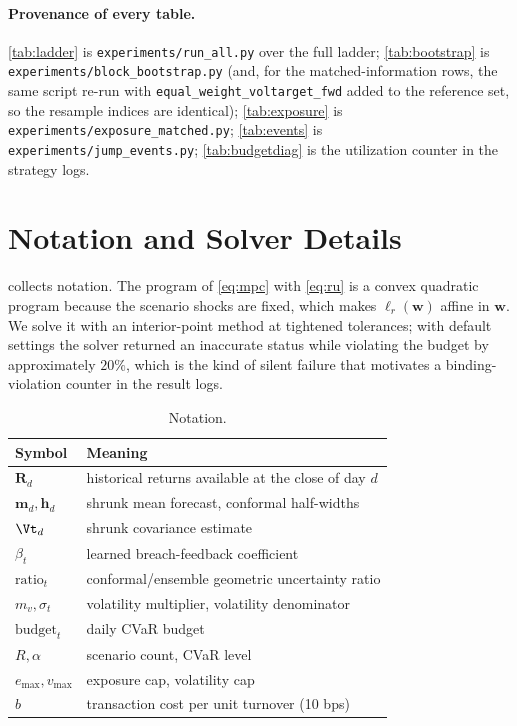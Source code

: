 \documentclass[journal]{IEEEtran}
\newcommand{\Rt}{\mathbf{R}}
\newcommand{\w}{\mathbf{w}}
\begin{document}
\paragraph{Provenance of every table.} \cref{tab:ladder} is
\texttt{experiments/run\_all.py} over the full ladder; \cref{tab:bootstrap} is
\texttt{experiments/block\_bootstrap.py} (and, for the matched-information rows,
the same script re-run with \texttt{equal\_weight\_voltarget\_fwd} added to the
reference set, so the resample indices are identical);
\cref{tab:exposure} is \texttt{experiments/exposure\_matched.py};
\cref{tab:events} is \texttt{experiments/jump\_events.py};
\cref{tab:budgetdiag} is the utilization counter in the strategy logs.

\appendices

\section{Notation and Solver Details}
\label{app:notation}

 collects notation. The program of \cref{eq:mpc} with
\cref{eq:ru} is a convex quadratic program because the scenario shocks are fixed,
which makes $\ell_r(\w)$ affine in $\w$. We solve it with an interior-point method
at tightened tolerances; with default settings the solver returned an inaccurate
status while violating the budget by approximately $20\%$, which is the kind of
silent failure that motivates a binding-violation counter in the result logs.

\begin{table}[!t]
  \centering
  \caption{Notation.}
  \label{tab:notation}
  \begin{tabular}{ll}
    \toprule
    Symbol & Meaning \\
    \midrule
    $\Rt_d$ & historical returns available at the close of day $d$ \\
    $\mathbf{m}_d,\mathbf{h}_d$ & shrunk mean forecast, conformal half-widths \\
    $\Vt_d$ & shrunk covariance estimate \\
    $\beta_t$ & learned breach-feedback coefficient \\
    $\text{ratio}_t$ & conformal/ensemble geometric uncertainty ratio \\
    $m_v,\sigma_t$ & volatility multiplier, volatility denominator \\
    $\text{budget}_t$ & daily CVaR budget \\
    $R,\alpha$ & scenario count, CVaR level \\
    $e_{\max},v_{\max}$ & exposure cap, volatility cap \\
    $b$ & transaction cost per unit turnover (10 bps) \\
    \bottomrule
  \end{tabular}
\end{table}
\end{document}
